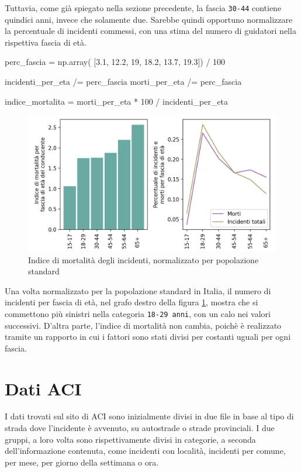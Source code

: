 \documentclass[a4paper,12pt]{report}
\newcommand{\columnstyle}[1]{\texttt{#1}}
\begin{document}
Tuttavia, come già spiegato nella sezione precedente, la fascia \columnstyle{30-44} 
contiene quindici anni, invece che solamente due. Sarebbe quindi opportuno 
normalizzare la percentuale di incidenti commessi, con una stima del numero di 
guidatori nella rispettiva fascia di età.

\begin{code}
perc_fascia = np.array( [3.1, 12.2, 19, 18.2, 13.7, 19.3]) / 100

incidenti_per_eta /= perc_fascia
morti_per_eta /= perc_fascia

indice_mortalita = morti_per_eta * 100 / incidenti_per_eta
\end{code}

\begin{figure}
    \includegraphics[width=\linewidth]{../src/incidenti/incidenti_senza_coords/mortalita/indice_mort_norm.png}
    \caption{Indice di mortalità degli incidenti, normalizzato per popolazione standard}
    \label{fig:indice-mort-norm}
\end{figure}

Una volta normalizzato per la popolazione standard in Italia, il numero di incidenti per 
fascia di età, nel grafo destro della figura \ref{fig:indice-mort-norm}, mostra che  
si commettono più sinistri nella categoria \columnstyle{18-29 anni}, 
con un calo nei valori successivi.
D'altra parte, l'indice di mortalità non cambia, poichè è realizzato tramite 
un rapporto in cui i fattori sono stati divisi per costanti uguali per ogni fascia.

\section{Dati ACI}

I dati trovati sul sito di ACI sono inizialmente divisi in due file in 
base al tipo di strada dove l'incidente è avvenuto, 
su autostrade o strade provinciali.
I due gruppi, a loro volta sono rispettivamente divisi in categorie, a seconda 
dell'informazione contenuta, come incidenti con località, incidenti per 
comune, per mese, per giorno della settimana o ora.
\end{document}
